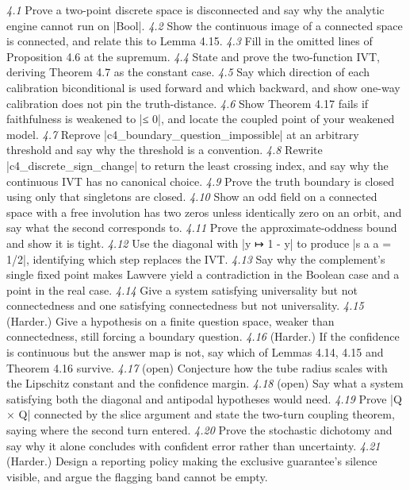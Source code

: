 \documentclass{memoir}
\begin{document}
\emph{4.1} Prove a two-point discrete space is disconnected and say why the analytic engine
cannot run on \LeanVerb|Bool|.
\emph{4.2} Show the continuous image of a connected space is connected, and relate this to
Lemma 4.15.
\emph{4.3} Fill in the omitted lines of Proposition 4.6 at the supremum.
\emph{4.4} State and prove the two-function IVT, deriving Theorem 4.7 as the constant case.
\emph{4.5} Say which direction of each calibration biconditional is used forward and which
backward, and show one-way calibration does not pin the truth-distance.
\emph{4.6} Show Theorem 4.17 fails if faithfulness is weakened to \LeanVerb|≤ 0|, and locate the
coupled point of your weakened model.
\emph{4.7} Reprove \LeanVerb|c4_boundary_question_impossible| at an arbitrary threshold and say
why the threshold is a convention.
\emph{4.8} Rewrite \LeanVerb|c4_discrete_sign_change| to return the least crossing index, and
say why the continuous IVT has no canonical choice.
\emph{4.9} Prove the truth boundary is closed using only that singletons are closed.
\emph{4.10} Show an odd field on a connected space with a free involution has two zeros
unless identically zero on an orbit, and say what the second corresponds to.
\emph{4.11} Prove the approximate-oddness bound and show it is tight.
\emph{4.12} Use the diagonal with \LeanVerb|y ↦ 1 - y| to produce \LeanVerb|s a a = 1/2|, identifying which
step replaces the IVT.
\emph{4.13} Say why the complement's single fixed point makes Lawvere yield a contradiction
in the Boolean case and a point in the real case.
\emph{4.14} Give a system satisfying universality but not connectedness and one satisfying
connectedness but not universality.
\emph{4.15} (Harder.) Give a hypothesis on a finite question space, weaker than
connectedness, still forcing a boundary question.
\emph{4.16} (Harder.) If the confidence is continuous but the answer map is not, say which
of Lemmas 4.14, 4.15 and Theorem 4.16 survive.
\emph{4.17} (open) Conjecture how the tube radius scales with the Lipschitz constant and the
confidence margin.
\emph{4.18} (open) Say what a system satisfying both the diagonal and antipodal hypotheses
would need.
\emph{4.19} Prove \LeanVerb|Q × Q| connected by the slice argument and state the two-turn coupling
theorem, saying where the second turn entered.
\emph{4.20} Prove the stochastic dichotomy and say why it alone concludes with confident
error rather than uncertainty.
\emph{4.21} (Harder.) Design a reporting policy making the exclusive guarantee's silence
visible, and argue the flagging band cannot be empty.
\end{document}
